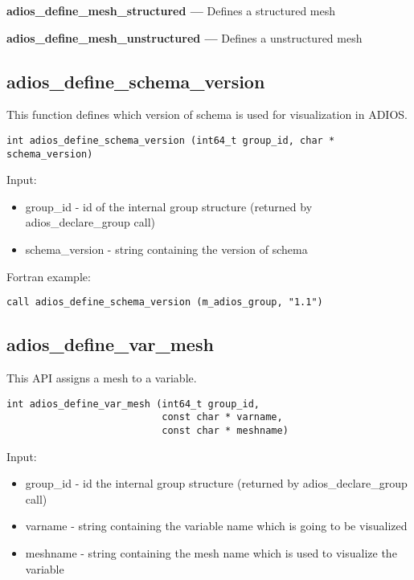 \textbf{adios\_define\_mesh\_structured ---} Defines a structured mesh

\textbf{adios\_define\_mesh\_unstructured ---} Defines a unstructured mesh

\subsection{adios\_define\_schema\_version}
This function defines which version of schema is used for visualization in ADIOS.

\begin{lstlisting}[alsolanguage=C,caption={},label={}]
int adios_define_schema_version (int64_t group_id, char * schema_version)
\end{lstlisting}

Input:
\begin{itemize}
\item group\_id - id of the internal group structure (returned by adios\_declare\_group call)
\item schema\_version - string containing the version of schema
\end{itemize}

Fortran example:
\begin{lstlisting}[alsolanguage=Fortran,caption={},label={}]
call adios_define_schema_version (m_adios_group, "1.1")
\end{lstlisting}


\subsection{adios\_define\_var\_mesh}
This API assigns a mesh to a variable.

\begin{lstlisting}[alsolanguage=C,caption={},label={}]
int adios_define_var_mesh (int64_t group_id, 
                           const char * varname, 
                           const char * meshname)
\end{lstlisting}

Input:
\begin{itemize}
\item group\_id - id the internal group structure (returned by adios\_declare\_group call)
\item varname - string containing the variable name which is going to be visualized
\item meshname - string containing the mesh name which is used to visualize the variable
\end{itemize}

